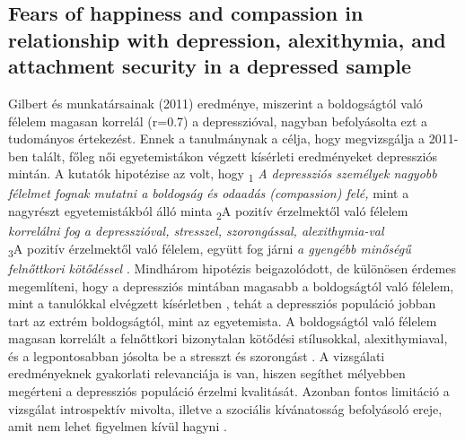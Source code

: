 \subsection*{Fears of happiness and compassion in relationship
	with depression, alexithymia, and attachment
	security in a depressed sample \parencite{gilbert_mcewan_catarino_baiao_palmeira_2013}}
Gilbert és munkatársainak (2011) eredménye, miszerint a boldogságtól való félelem magasan korrelál (r=0.7) a depresszióval, nagyban befolyásolta ezt a tudományos értekezést. Ennek a tanulmánynak a célja, hogy megvizsgálja a 2011-ben talált, főleg női egyetemistákon végzett kísérleti eredményeket depressziós mintán. A kutatók hipotézise az volt,  hogy \textsubscript{1} \textit{ A depressziós személyek nagyobb félelmet fognak mutatni a boldogság és odaadás (compassion) felé,}  mint a nagyrészt egyetemis\-tákból álló minta \textsubscript{2}A pozitív érzelmektől való félelem \textit{korrelálni fog a depresszióval, stresszel, szorongással, alexithymia-val } \\  \textsubscript{3}A pozitív érzelmektől való félelem, együtt fog járni \textit{a gyengébb minőségű felnőttkori kötődéssel} \parencite{gilbert_mcewan_catarino_baiao_palmeira_2013}. Mindhárom hipotézis beigazolódott, de különösen érdemes megemlíteni, hogy a depressziós mintában magasabb a boldogságtól való félelem, mint a tanulókkal elvégzett kísérletben \parencite{gilbert_mcewan_gibbons_chotai_duarte_matos_2011}, tehát a depressziós populáció jobban tart az extrém boldogságtól, mint az egyetemista. A boldogságtól való félelem magasan korrelált a felnőttkori bizonytalan kötődési stílusokkal, alexithymiaval, és a legpontosabban jósolta be a stresszt és szorongást \parencite{gilbert_mcewan_catarino_baiao_palmeira_2013}. A vizsgálati eredményeknek gyakorlati relevanciája is van, hiszen segíthet mélyebben megérteni a depressziós populáció érzelmi kvalitását. Azonban fontos limitáció a vizsgálat introspektív mivolta, illetve a szociális kívánatosság befolyásoló ereje, amit nem lehet figyelmen kívül hagyni \parencite{gilbert_mcewan_catarino_baiao_palmeira_2013}.

